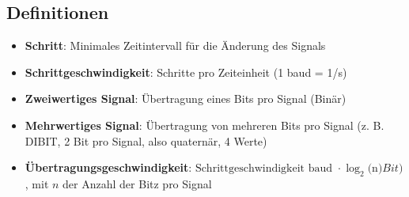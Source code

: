 \documentclass[a4paper,parskip=half*,DIV=15,fontsize=11pt]{scrartcl}
\begin{document}
\subsection{Definitionen}
\begin{itemize}
\item \textbf{Schritt}: Minimales Zeitintervall für die Änderung des Signals
\item \textbf{Schrittgeschwindigkeit}: Schritte pro Zeiteinheit (1 baud = 1/s)
\item \textbf{Zweiwertiges Signal}: Übertragung eines Bits pro Signal (Binär)
\item \textbf{Mehrwertiges Signal}: Übertragung von mehreren Bits pro Signal (z. B. DIBIT, 2 Bit pro Signal, also quaternär, 4 Werte)
\item \textbf{Übertragungsgeschwindigkeit}: $\textrm{Schrittgeschwindigkeit baud } \cdot \log_2($n$) Bit)$, mit $n$ der Anzahl der Bitz pro Signal
\end{itemize}
\end{document}

